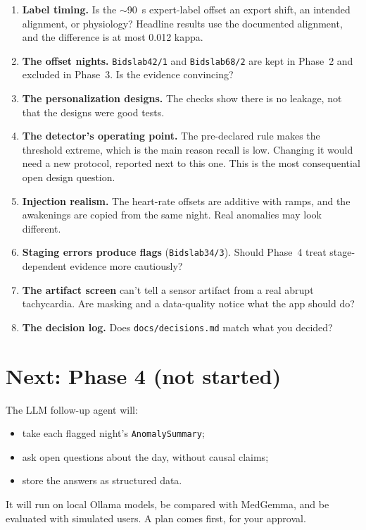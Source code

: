 \documentclass[11pt,a4paper]{article}
\newcommand{\night}[2]{\texttt{Bidslab#1/#2}}
\newcommand{\code}[1]{\texttt{#1}}
\begin{document}
\begin{enumerate}
\item \textbf{Label timing.} Is the $\sim$90~s expert-label offset an export shift, an intended
alignment, or physiology? Headline results use the documented alignment, and the difference is
at most 0.012 kappa.
\item \textbf{The offset nights.} \night{42}{1} and \night{68}{2} are kept in Phase~2 and
excluded in Phase~3. Is the evidence convincing?
\item \textbf{The personalization designs.} The checks show there is no leakage, not that the
designs were good tests.
\item \textbf{The detector's operating point.} The pre-declared rule makes the threshold extreme,
which is the main reason recall is low. Changing it would need a new protocol, reported next to
this one. This is the most consequential open design question.
\item \textbf{Injection realism.} The heart-rate offsets are additive with ramps, and the
awakenings are copied from the same night. Real anomalies may look different.
\item \textbf{Staging errors produce flags} (\night{34}{3}). Should Phase~4 treat
stage-dependent evidence more cautiously?
\item \textbf{The artifact screen} can't tell a sensor artifact from a real abrupt tachycardia.
Are masking and a data-quality notice what the app should do?
\item \textbf{The decision log.} Does \code{docs/decisions.md} match what you decided?
\end{enumerate}

\section{Next: Phase 4 (not started)}

The LLM follow-up agent will:
\begin{itemize}
\item take each flagged night's \code{AnomalySummary};
\item ask open questions about the day, without causal claims;
\item store the answers as structured data.
\end{itemize}
It will run on local Ollama models, be compared with MedGemma, and be evaluated with simulated
users. A plan comes first, for your approval.
\end{document}
